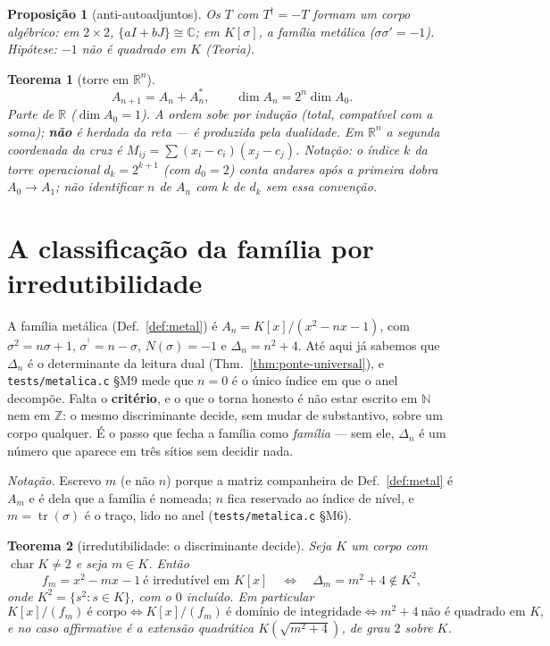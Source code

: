 \documentclass[11pt,a4paper]{article}
\newcommand{\dg}{^{\dagger}}
\newtheorem{teorema}{Teorema}
\newtheorem{proposicao}{Proposição}
\newcommand{\code}[1]{\texttt{#1}}
\begin{document}
\begin{proposicao}[anti-autoadjuntos]\label{prop:anti}
Os $T$ com $T^{\dagger}=-T$ formam um corpo algébrico: em $2\times2$,
$\{aI+bJ\}\cong\mathbb{C}$; em $K[\sigma]$, a família metálica
($\sigma\sigma'=-1$). Hipótese: $-1$ não é quadrado em $K$
(\emph{Teoria}).
\end{proposicao}

\begin{teorema}[torre em $\mathbb{R}^{n}$]\label{thm:rn}
\[
A_{n+1}=A_n+A_n^{*},
\qquad
\dim A_n=2^{n}\dim A_0.
\]
Parte de $\mathbb{R}$ ($\dim A_0=1$). A ordem sobe por indução (total,
compatível com a soma); \textbf{não} é herdada da reta --- é produzida
pela dualidade. Em $\mathbb{R}^{n}$ a segunda coordenada da cruz é
$M_{ij}=\sum(x_i-c_i)(x_j-c_j)$.
\emph{Notação:} o índice $k$ da torre operacional
$d_k=2^{k+1}$ (com $d_0=2$) conta andares \emph{após} a primeira
dobra $A_0\to A_1$; não identificar $n$ de $A_n$ com $k$ de $d_k$ sem
essa convenção.
\end{teorema}

\section{A classificação da família por irredutibilidade}\label{sec:metal-irred}

A família metálica (Def.~\ref{def:metal}) é $A_n=K[x]/(x^{2}-nx-1)$, com $\sigma^{2}=n\sigma+1$,
$\sigma^{\dg}=n-\sigma$, $N(\sigma)=-1$ e $\Delta_n=n^{2}+4$. Até aqui já sabemos que
$\Delta_n$ é o determinante da leitura dual (Thm.~\ref{thm:ponte-universal}), e
\code{tests/metalica.c} §M9 mede que $n=0$ é o único índice em que o anel decompõe. Falta
o \textbf{critério}, e o que o torna honesto é não estar escrito em $\mathbb{N}$ nem em
$\mathbb{Z}$: o mesmo discriminante decide, sem mudar de substantivo, sobre um corpo
qualquer. É o passo que fecha a família como \emph{família} --- sem ele, $\Delta_n$ é um
número que aparece em três sítios sem decidir nada.

\noindent\emph{Notação.} Escrevo $m$ (e não $n$) porque a matriz companheira de
Def.~\ref{def:metal} é $A_m$ e é dela que a família é nomeada; $n$ fica reservado ao
índice de nível, e $m=\operatorname{tr}(\sigma)$ é o traço, lido no anel
(\code{tests/metalica.c} §M6).

\begin{teorema}[irredutibilidade: o discriminante decide]\label{thm:irred}
Seja $K$ um corpo com $\operatorname{char}K\neq2$ e seja $m\in K$. Então
\[
f_m=x^{2}-mx-1\ \text{é irredutível em }K[x]
\quad\Longleftrightarrow\quad
\Delta_m=m^{2}+4\notin K^{2},
\]
onde $K^{2}=\{s^{2}:s\in K\}$, \emph{com o $0$ incluído}. Em particular
\[
\boxed{
K[x]/(f_m)\ \text{é corpo}
\iff
K[x]/(f_m)\ \text{é domínio de integridade}
\iff
m^{2}+4\ \text{não é quadrado em }K,
}
\]
e no caso affirmative é a extensão quadrática $K(\sqrt{m^{2}+4})$, de grau $2$ sobre $K$.
\end{teorema}
\end{document}
